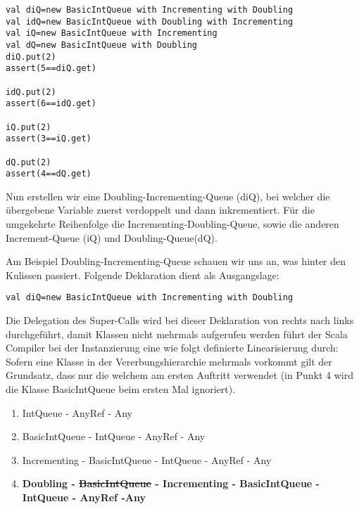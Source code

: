 \begin{lstlisting}[caption=Traits: Verschiedene Instanzen vom Typ IntQueue und die entsprechenden Auswirkungen]
val diQ=new BasicIntQueue with Incrementing with Doubling
val idQ=new BasicIntQueue with Doubling with Incrementing
val iQ=new BasicIntQueue with Incrementing
val dQ=new BasicIntQueue with Doubling
diQ.put(2)
assert(5==diQ.get)

idQ.put(2)
assert(6==idQ.get)

iQ.put(2)
assert(3==iQ.get)

dQ.put(2)
assert(4==dQ.get)
\end{lstlisting}
Nun erstellen wir eine Doubling-Incrementing-Queue (diQ), bei welcher die \"ubergebene Variable zuerst verdoppelt und dann inkrementiert. F\"ur die umgekehrte Reihenfolge die Incrementing-Doubling-Queue, sowie die anderen Increment-Queue (iQ) und Doubling-Queue(dQ).

Am Beispiel Doubling-Incrementing-Queue schauen wir uns an, was hinter den Kulissen passiert. Folgende Deklaration dient als Ausgangslage: 
\begin{lstlisting}[caption=Traits: Deklaration Doubling-Incrementing-Queue]
val diQ=new BasicIntQueue with Incrementing with Doubling
\end{lstlisting}

Die Delegation des Super-Calls wird bei dieser Deklaration von rechts nach links durchgef\"uhrt, damit Klassen nicht mehrmals aufgerufen werden f\"uhrt der Scala Compiler bei der Instanzierung eine wie folgt definierte Linearisierung durch: Sofern eine Klasse in der Vererbungshierarchie mehrmals vorkommt gilt der Grundsatz, dass nur die welchem am ersten Auftritt verwendet (in Punkt 4 wird die Klasse BasicIntQueue beim ersten Mal ignoriert). 
\begin{enumerate}
	\item IntQueue - AnyRef - Any
	\item BasicIntQueue - IntQueue - AnyRef - Any
	\item Incrementing - BasicIntQueue - IntQueue - AnyRef - Any
	\item \bf{Doubling - \sout{BasicIntQueue} - Incrementing - BasicIntQueue - IntQueue - AnyRef -Any}
\end{enumerate}

